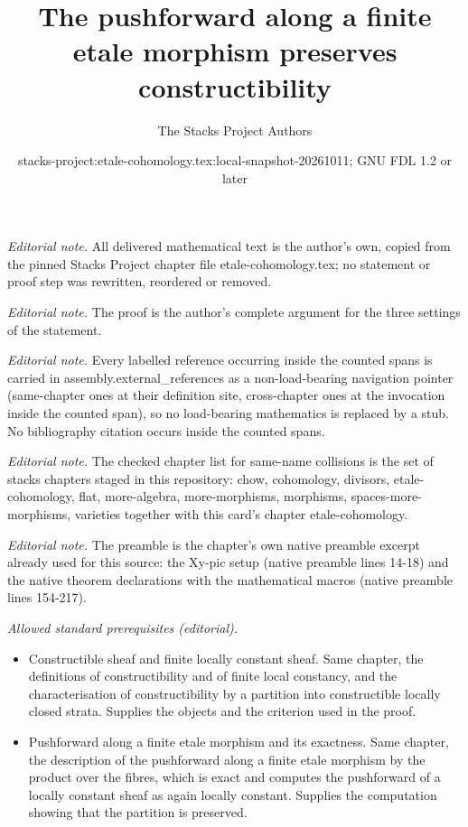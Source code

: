 \documentclass[10pt,a4paper]{amsart}
\title{The pushforward along a finite etale morphism preserves constructibility}
\author{The Stacks Project Authors}
\date{stacks-project:etale-cohomology.tex:local-snapshot-20261011; GNU FDL 1.2 or later}
\theoremstyle{plain}
\theoremstyle{definition}
\theoremstyle{remark}
\numberwithin{equation}{subsection}
\begin{document}
\maketitle
\noindent\textit{Editorial note.} All delivered mathematical text is the author's own, copied from the pinned Stacks Project chapter file etale-cohomology.tex; no statement or proof step was rewritten, reordered or removed.\par\medskip
\noindent\textit{Editorial note.} The proof is the author's complete argument for the three settings of the statement.\par\medskip
\noindent\textit{Editorial note.} Every labelled reference occurring inside the counted spans is carried in assembly.external\_references as a non-load-bearing navigation pointer (same-chapter ones at their definition site, cross-chapter ones at the invocation inside the counted span), so no load-bearing mathematics is replaced by a stub. No bibliography citation occurs inside the counted spans.\par\medskip
\noindent\textit{Editorial note.} The checked chapter list for same-name collisions is the set of stacks chapters staged in this repository: chow, cohomology, divisors, etale-cohomology, flat, more-algebra, more-morphisms, morphisms, spaces-more-morphisms, varieties together with this card's chapter etale-cohomology.\par\medskip
\noindent\textit{Editorial note.} The preamble is the chapter's own native preamble excerpt already used for this source: the Xy-pic setup (native preamble lines 14-18) and the native theorem declarations with the mathematical macros (native preamble lines 154-217).\par\medskip
\noindent\textit{Allowed standard prerequisites (editorial).}\begin{itemize}
\item Constructible sheaf and finite locally constant sheaf. Same chapter, the definitions of constructibility and of finite local constancy, and the characterisation of constructibility by a partition into constructible locally closed strata. Supplies the objects and the criterion used in the proof.
\item Pushforward along a finite etale morphism and its exactness. Same chapter, the description of the pushforward along a finite etale morphism by the product over the fibres, which is exact and computes the pushforward of a locally constant sheaf as again locally constant. Supplies the computation showing that the partition is preserved.
\end{itemize}\medskip
\end{document}
